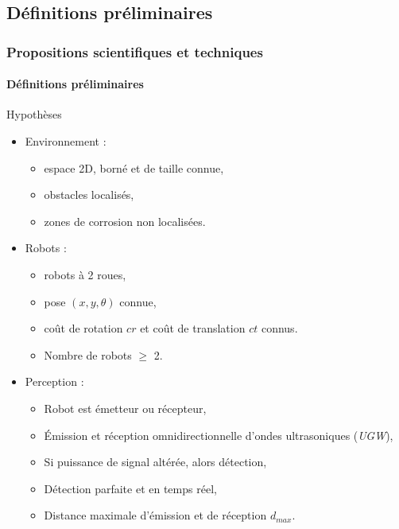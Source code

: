 \documentclass{beamer}
\begin{document}
		\subsection{Définitions préliminaires}
			\begin{frame}[shrink=5]
				\frametitle{Propositions scientifiques et techniques}
				\framesubtitle{Définitions préliminaires}
				\begin{block}{Hypothèses}
					\begin{itemize}
						\item Environnement :
						\begin{itemize}
							\item espace 2D, borné et de taille connue,
							\item obstacles localisés,
							\item zones de corrosion non localisées.
						\end{itemize}
						\item Robots :
						\begin{itemize}
							\item robots à 2 roues,
							\item pose $(x, y, \theta)$ connue,
							\item coût de rotation $cr$ et coût de translation $ct$ connus.
							\item Nombre de robots $\ge$ 2.
						\end{itemize}
						\item Perception :
						\begin{itemize}
							\item Robot est émetteur ou récepteur,
							\item Émission et réception omnidirectionnelle d'ondes ultrasoniques (\textit{UGW}),
							\item Si puissance de signal altérée, alors détection,
							\item Détection parfaite et en temps réel,
							\item Distance maximale d'émission et de réception $d_{max}$.
						\end{itemize}
					\end{itemize}
				\end{block}
			\end{frame}
\end{document}

